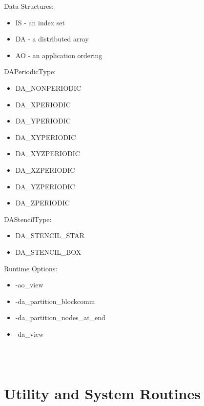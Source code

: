 {\noindent
Data Structures:
\begin{itemize}
\item IS - an index set
\item DA - a distributed array
\item AO - an application ordering
\end{itemize}
DAPeriodicType:
\begin{itemize}
\item DA\_NONPERIODIC
\item  DA\_XPERIODIC
\item  DA\_YPERIODIC
\item  DA\_XYPERIODIC
\item  DA\_XYZPERIODIC
\item  DA\_XZPERIODIC
\item  DA\_YZPERIODIC
\item DA\_ZPERIODIC
\end{itemize}
DAStencilType:
\begin{itemize}
\item DA\_STENCIL\_STAR
\item DA\_STENCIL\_BOX 
\end{itemize}
Runtime Options:
\begin{itemize}
\item -ao\_view
\item -da\_partition\_blockcomm
\item -da\_partition\_nodes\_at\_end
\item -da\_view
\end{itemize}

 \\
 \\

{\footnotesize
\noindent



}

\section{Utility and System Routines}

}
